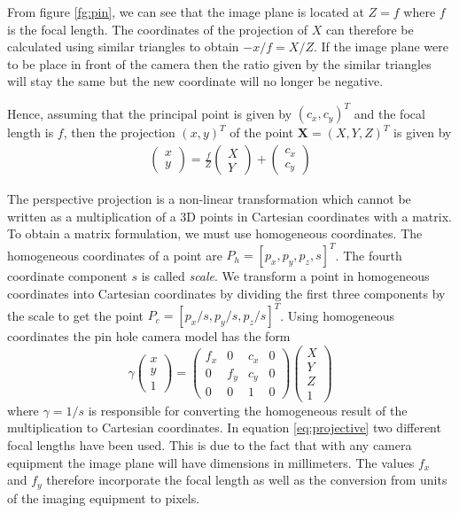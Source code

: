 \documentclass[11pt,a4paper,twoside]{report}
\begin{document}
From figure \ref{fg:pin}, we can see that the image plane is located at $Z=f$
where $f$ is the focal length. The coordinates of the projection of $X$ can
therefore be calculated using similar triangles to obtain $-x/f = X/Z$.
If the image plane were to be place in front of the camera then the ratio given
by the similar triangles will stay the same but the new coordinate will no
longer be negative.

Hence, assuming that the principal point is given by $(c_x,c_y)^T$ and the focal
length is $f$, then the projection $(x,y)^T$ of the point $\mathbf{X} = (X,Y,Z)^T$ is given by
\begin{align}\label{eq:pinCoord}
\begin{pmatrix}x\\y\end{pmatrix} = \frac{f}{Z}\begin{pmatrix}X\\Y\end{pmatrix} + \begin{pmatrix}c_x\\c_y\end{pmatrix}
\end{align}


The perspective projection is a non-linear transformation which cannot be written
as a multiplication of a 3D points in Cartesian coordinates with a matrix. To obtain a matrix formulation, we must
use homogeneous coordinates. The homogeneous coordinates of a point are $P_h =
[p_x,p_y,p_z,s]^T$. The fourth coordinate component $s$ is called
\textit{scale}. We transform a point in homogeneous coordinates into Cartesian
coordinates by dividing the first three components by the scale to get the point
$P_c = [p_x/s, p_y/s, p_z/s]^T$. Using homogeneous coordinates the pin hole
camera model has the form
\begin{equation}\label{eq:projective}
\gamma\begin{pmatrix}x\\y\\1\end{pmatrix}
= \begin{pmatrix}f_x&0&c_x&0\\0&f_y&c_y&0\\0&0&1&0\end{pmatrix} \begin{pmatrix}X\\Y\\Z\\1\end{pmatrix}
\end{equation}
where $\gamma = 1/s$ is responsible for converting the homogeneous result of the
multiplication to Cartesian coordinates. In equation \ref{eq:projective} two
different focal lengths have been used. This is due to the fact that with any
camera equipment the image plane will have dimensions in millimeters. The values
$f_x$ and $f_y$ therefore incorporate the focal length as well as the conversion
from units of the imaging equipment to pixels.
\end{document}
